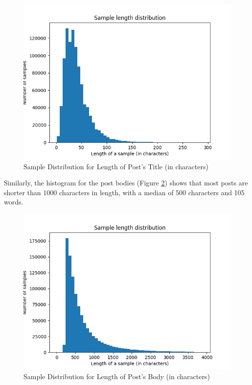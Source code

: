 \documentclass{sig-alternate-05-2015}
\begin{document}
\begin{figure}[H]
\centering
\includegraphics[width=\linewidth]{plots/sample-length-distribution-title-1000000.png}
\caption{Sample Distribution for Length of Post's Title (in characters)}
\label{fig:sampleLengthDistributionTitle}
\end{figure}

Similarly, the histogram for the post bodies (Figure \ref{fig:sampleLengthDistributionSelftext}) shows that most posts are shorter than 1000 characters in length, with a median of 500 characters and 105 words.

\begin{figure}[H]
\centering
\includegraphics[width=\linewidth]{plots/sample-length-distribution-selftext-1000000.png}
\caption{Sample Distribution for Length of Post's Body (in characters)}
\label{fig:sampleLengthDistributionSelftext}
\end{figure}
\end{document}
